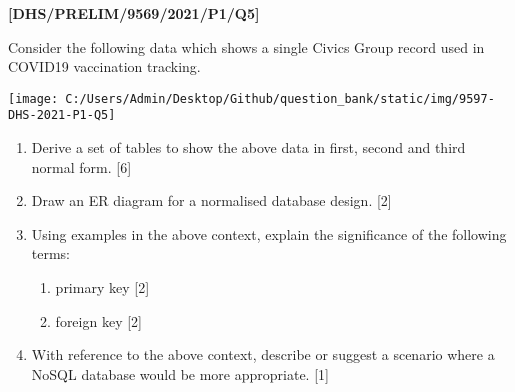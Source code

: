 \item \textbf{{[}DHS/PRELIM/9569/2021/P1/Q5{]} }

Consider the following data which shows a single Civics Group record
used in COVID19 vaccination tracking. 
\noindent \begin{center}
\texttt{[image: C:/Users/Admin/Desktop/Github/question\_bank/static/img/9597-DHS-2021-P1-Q5]}
\par\end{center}
\begin{enumerate}
\item Derive a set of tables to show the above data in first, second and
third normal form. \hfill{}{[}6{]}
\item Draw an ER diagram for a normalised database design. \hfill{} {[}2{]}
\item Using examples in the above context, explain the significance of the
following terms:
\begin{enumerate}
\item primary key \hfill{}{[}2{]}
\item foreign key \hfill{}{[}2{]}
\end{enumerate}
\item With reference to the above context, describe or suggest a scenario
where a NoSQL database would be more appropriate. \hfill{} {[}1{]}
\end{enumerate}